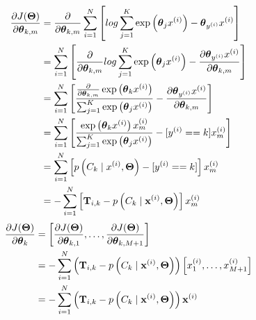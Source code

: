 \begin{enumerate}[label=(\alph*)]
    
    \begin{solution}
    \begin{equation}\nonumber
    \begin{aligned}
    \frac{\partial J(\boldsymbol \Theta)}{\partial \boldsymbol \theta_{k, m}}
    &= \frac{\partial}{\partial \boldsymbol \theta_{k, m}}\sum_{i = 1}^N\left[log\sum_{j = 1}^K \exp\left(\boldsymbol \theta_{j} x^{(i)}\right) - \boldsymbol \theta_{y^{(i)}} x^{(i)}\right]\\
    &= \sum_{i = 1}^N\left[\frac{\partial}{\partial \boldsymbol \theta_{k, m}}log\sum_{j = 1}^K \exp\left(\boldsymbol \theta_{j} x^{(i)}\right) - \frac{\partial \boldsymbol \theta_{y^{(i)}} x^{(i)}}{\partial \boldsymbol \theta_{k, m}}\right]\\
    &= \sum_{i = 1}^N \left[\frac{\frac{\partial}{\partial \boldsymbol \theta_{k, m}}\exp\left(\boldsymbol \theta_{k} x^{(i)}\right)}{\sum_{j = 1}^K \exp\left(\boldsymbol \theta_{j} x^{(i)}\right)}- \frac{\partial \boldsymbol \theta_{y^{(i)}} x^{(i)}}{\partial \boldsymbol \theta_{k, m}}\right]\\
    &= \sum_{i = 1}^N \left[\frac{\exp\left(\boldsymbol \theta_{k} x^{(i)}\right)x^{(i)}_m}{\sum_{j = 1}^K \exp\left(\boldsymbol \theta_{j} x^{(i)}\right)} - [y^{(i)} == k]x^{(i)}_m\right]\\
    &= \sum_{i = 1}^N \left[p\left(C_{k} \mid x^{(i)}, \boldsymbol \Theta \right) - [y^{(i)} == k]\right]x^{(i)}_m\\
    &= - \sum_{i = 1}^N \left[\mathbf{T}_{i, k} - p\left(C_k \mid \mathbf{x}^{(i)}, \boldsymbol \Theta\right)\right]x^{(i)}_m\\
    \end{aligned}
    \end{equation}
    \begin{equation}\nonumber
    \begin{aligned}
    \frac{\partial J(\boldsymbol \Theta)}{\partial \boldsymbol \theta_k} 
    &= \left[\frac{\partial J(\boldsymbol \Theta)}{\partial \boldsymbol \theta_{k, 1}}, \dots, \frac{\partial J(\boldsymbol \Theta)}{\partial \boldsymbol \theta_{k, M + 1}}\right]\\
    &= - \sum_{i = 1}^N \left(\mathbf{T}_{i, k} - p\left(C_k \mid \mathbf{x}^{(i)}, \boldsymbol \Theta\right)\right)\left[x^{(i)}_1, \dots, x^{(i)}_{M+1}\right]\\
    &= - \sum_{i = 1}^N \left(\mathbf{T}_{i, k} - p\left(C_k \mid \mathbf{x}^{(i)}, \boldsymbol \Theta\right)\right)  \mathbf{x}^{(i)}
    \end{aligned}
    \end{equation}
    \bigskip \bigskip \bigskip \bigskip \bigskip \bigskip \bigskip \bigskip
    \bigskip \bigskip \bigskip \bigskip \bigskip \bigskip \bigskip \bigskip
    \bigskip \bigskip \bigskip \bigskip \bigskip \bigskip \bigskip \bigskip
    \bigskip \bigskip \bigskip \bigskip \bigskip \bigskip \bigskip \bigskip
    \bigskip \bigskip \bigskip \bigskip \bigskip \bigskip \bigskip \bigskip
    \bigskip \bigskip \bigskip \bigskip \bigskip \bigskip \bigskip \bigskip
    \end{solution}
    

\end{enumerate}
